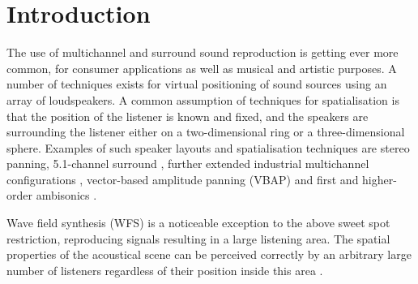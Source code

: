 \documentclass[twoside,10pt]{article}
\title{\papertitle}
\begin{document}
    
\maketitle




%
%




\begin{abstract}
The abstract should be placed at the top left column and should contain
about 150 words.
\end{abstract}








%
%


\section{Introduction}\label{sec:introduction}

The use of multichannel and surround sound reproduction is getting ever more common, for consumer applications as well as musical and artistic purposes. A number of techniques exists for virtual positioning of sound sources using an array of loudspeakers. A common assumption of techniques for spatialisation is that the position of the listener is known and fixed, and the speakers are surrounding the listener either on a two-dimensional ring or a three-dimensional sphere. Examples of such speaker layouts and spatialisation techniques are stereo panning, 5.1-channel surround \cite{ITU:1993_surround_5:1}, further extended industrial multichannel configurations \cite{Rumsey:2001spatial_audio}, vector-based amplitude panning (VBAP) \cite{Pulkki:1997vbap} and first and higher-order ambisonics \cite{Gerzon:1974surround, Poletti:2000holographic_sound}.

Wave field synthesis (WFS) is a noticeable exception to the above sweet spot restriction, reproducing signals resulting in a large listening area. The spatial properties of the acoustical scene can be perceived correctly by an arbitrary large number of listeners regardless of their position inside this area \cite{Spors:2004sound_field_synthesis}.
\end{document}

